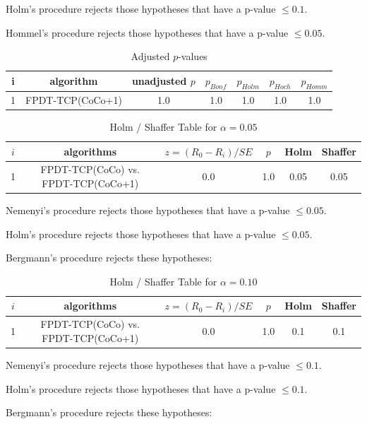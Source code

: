 \documentclass[a4paper,10pt]{article}
\begin{document}
\begin{landscape}
Holm's procedure rejects those hypotheses that have a p-value $\le0.1$.


Hommel's procedure rejects those hypotheses that have a p-value $\le0.05$.


\begin{table}[!htp]
\centering\tiny
\caption{Adjusted $p$-values}
\begin{tabular}{ccccccc}
i&algorithm&unadjusted $p$&$p_{Bonf}$&$p_{Holm}$&$p_{Hoch}$&$p_{Homm}$\\
\hline
1&FPDT-TCP(CoCo+1)&1.0&1.0&1.0&1.0&1.0\\
\hline
\end{tabular}
\end{table}

\begin{table}[!htp]
\centering\tiny
\caption{Holm / Shaffer Table for $\alpha=0.05$}
\begin{tabular}{cccccc}
$i$&algorithms&$z=(R_0 - R_i)/SE$&$p$&Holm&Shaffer\\
\hline
1&FPDT-TCP(CoCo) vs. FPDT-TCP(CoCo+1)&0.0&1.0&0.05&0.05\\\hline
\end{tabular}
\end{table}
Nemenyi's procedure rejects those hypotheses that have a p-value $\le0.05$.


Holm's procedure rejects those hypotheses that have a p-value $\le0.05$.


Bergmann's procedure rejects these hypotheses:


\begin{itemize}


\end{itemize}


\begin{table}[!htp]
\centering\tiny
\caption{Holm / Shaffer Table for $\alpha=0.10$}
\begin{tabular}{cccccc}
$i$&algorithms&$z=(R_0 - R_i)/SE$&$p$&Holm&Shaffer\\
\hline
1&FPDT-TCP(CoCo) vs. FPDT-TCP(CoCo+1)&0.0&1.0&0.1&0.1\\\hline
\end{tabular}
\end{table}
Nemenyi's procedure rejects those hypotheses that have a p-value $\le0.1$.


Holm's procedure rejects those hypotheses that have a p-value $\le0.1$.


Bergmann's procedure rejects these hypotheses:


\begin{itemize}



\end{itemize}
\end{landscape}
\end{document}
